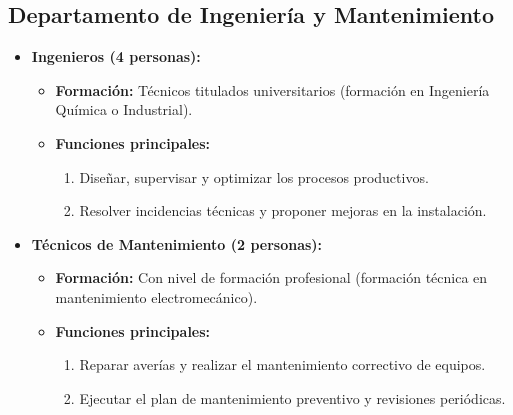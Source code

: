 \subsection{Departamento de Ingeniería y Mantenimiento}
\begin{itemize}[leftmargin=*]
    \item \textbf{Ingenieros (4 personas):}
          \begin{itemize}
              \item \textbf{Formación:} Técnicos titulados universitarios (formación en Ingeniería Química o Industrial).
              \item \textbf{Funciones principales:}
                    \begin{enumerate}
                        \item Diseñar, supervisar y optimizar los procesos productivos.
                        \item Resolver incidencias técnicas y proponer mejoras en la instalación.
                    \end{enumerate}
          \end{itemize}

    \item \textbf{Técnicos de Mantenimiento (2 personas):}
          \begin{itemize}
              \item \textbf{Formación:} Con nivel de formación profesional (formación técnica en mantenimiento electromecánico).
              \item \textbf{Funciones principales:}
                    \begin{enumerate}
                        \item Reparar averías y realizar el mantenimiento correctivo de equipos.
                        \item Ejecutar el plan de mantenimiento preventivo y revisiones periódicas.
                    \end{enumerate}
          \end{itemize}
\end{itemize}

